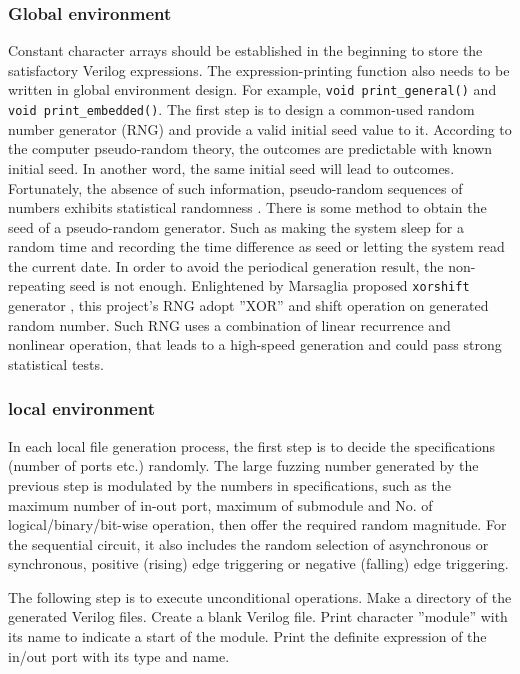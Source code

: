 \subsubsection{Global environment}
\label{Global design}
Constant character arrays should be established in the beginning to store the satisfactory Verilog expressions. The expression-printing function also needs to be written in global environment design. For example, \texttt{void print\_general()} and \texttt{void print\_embedded()}.
The first step is to design a common-used random number generator (RNG) and provide a valid initial seed value to it. According to the computer pseudo-random theory, the outcomes are predictable with known initial seed.  In another word, the same initial seed will lead to outcomes. Fortunately, the absence of such information, pseudo-random sequences of numbers exhibits statistical randomness \cite{von195113}. There is some method to obtain the seed of a pseudo-random generator. Such as making the system sleep for a random time and recording the time difference as seed or letting the system read the current date. In order to avoid the periodical generation result, the non-repeating seed is not enough. Enlightened by Marsaglia proposed \texttt{xorshift} generator \cite{marsaglia2003xorshift}, this project's RNG adopt ''XOR'' and shift operation on generated random number. Such RNG uses a combination of linear recurrence and nonlinear operation, that leads to a high-speed generation and could pass strong statistical tests\cite{panneton2005xorshift,marsaglia2003xorshift}. 

\subsubsection{local environment}
In each local file generation process, the first step is to decide the specifications (number of ports etc.) randomly. The large fuzzing number generated by the previous step is modulated by the numbers in specifications, such as the maximum number of in-out port, maximum of submodule and No. of logical/binary/bit-wise operation, then offer the required random magnitude. For the sequential circuit, it also includes the random selection of asynchronous or synchronous, positive (rising) edge triggering or negative (falling) edge triggering.

The following step is to execute unconditional operations. Make a directory of the generated Verilog files. Create a blank Verilog file. Print character ''module'' with its name to indicate a start of the module. Print the definite expression of the in/out port with its type and name.

